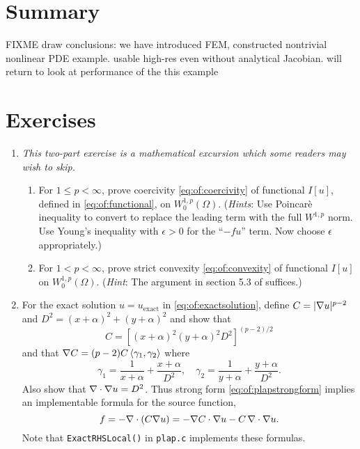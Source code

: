\section{Summary}

FIXME draw conclusions: we have introduced FEM, constructed nontrivial nonlinear PDE example.  usable high-res even without analytical Jacobian.  will return to look at performance of the this example


\section{Exercises}

\renewcommand{\labelenumi}{\arabic{chapter}.\arabic{enumi}\quad}
\renewcommand{\labelenumii}{(\alph{enumii})}
\begin{enumerate}
\item  \label{exer:of:twoproperties}  \emph{This two-part exercise is a mathematical excursion which some readers may wish to skip.}
  \begin{enumerate}
  \item For $1 \le p < \infty$, prove coercivity \eqref{eq:of:coercivity} of functional $I[u]$, defined in \eqref{eq:of:functional}, on $W_0^{1,p}(\Omega)$.  (\emph{Hints}:  Use Poincar\`e inequality \citep[Theorem 6.30]{AdamsFournier2003} to convert to replace the leading term with the full $W^{1,p}$ norm.  Use Young's inequality with $\epsilon>0$ \citep[Appendix B]{Evans2010} for the ``$-fu$'' term.  Now choose $\epsilon$ appropriately.)
  \item For $1 < p < \infty$, prove strict convexity \eqref{eq:of:convexity} of functional $I[u]$ on $W_0^{1,p}(\Omega)$.  (\emph{Hint}:  The argument in section 5.3 of \citet{Ciarlet2002} suffices.)
  \end{enumerate}
 
\item \label{exer:of:checkexactformulas}  For the exact solution $u=u_{\text{exact}}$ in \eqref{eq:of:exactsolution}, define $C = |\nabla u|^{p-2}$ and $D^2=(x+\alpha)^2 + (y+\alpha)^2$ and show that
    $$C = \left[(x+\alpha)^2 (y+\alpha)^2 D^2\right]^{(p-2)/2}$$
and that $\nabla C = (p-2) C \left<\gamma_1,\gamma_2\right>$ where
    $$\gamma_1 = \frac{1}{x+\alpha}+ \frac{x+\alpha}{D^2}, \quad \gamma_2 = \frac{1}{y+\alpha}+ \frac{y+\alpha}{D^2}.$$
Also show that $\nabla\cdot \nabla u = D^2$.  Thus strong form \eqref{eq:of:plapstrongform} implies an implementable formula for the source function,
    $$f = - \nabla\cdot \left(C \nabla u\right) = - \nabla C \cdot \nabla u - C\, \nabla\cdot \nabla u.$$
Note that \texttt{ExactRHSLocal()} in \texttt{plap.c} implements these formulas.


\end{enumerate}
